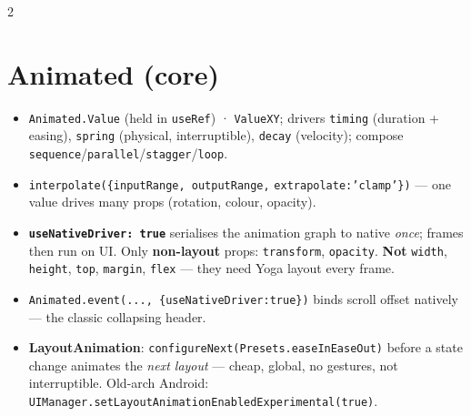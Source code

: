 \documentclass[8pt]{extarticle}
\begin{document}
\begin{multicols}{2}
\raggedright

\section{Animated (core)}
\begin{itemize}
  \item \texttt{Animated.Value} (held in \texttt{useRef}) · \texttt{ValueXY}; drivers
        \texttt{timing} (duration + easing), \texttt{spring} (physical, interruptible),
        \texttt{decay} (velocity); compose \texttt{sequence}/\texttt{parallel}/\texttt{stagger}/\texttt{loop}.
  \item \texttt{interpolate(\{inputRange, outputRange,} \texttt{extrapolate:'clamp'\})} —
        one value drives many props (rotation, colour, opacity).
  \item \textbf{\texttt{useNativeDriver: true}} serialises the animation graph to native
        \emph{once}; frames then run on UI. Only \textbf{non-layout} props:
        \texttt{transform}, \texttt{opacity}. \textbf{Not} \texttt{width}, \texttt{height},
        \texttt{top}, \texttt{margin}, \texttt{flex} — they need Yoga layout every frame.
  \item \texttt{Animated.event(..., \{useNativeDriver:true\})} binds scroll offset
        natively — the classic collapsing header.
  \item \textbf{LayoutAnimation}: \texttt{configureNext(Presets.easeInEaseOut)} before
        a state change animates the \emph{next layout} — cheap, global, no gestures, not
        interruptible. Old-arch Android: \texttt{UIManager.setLayoutAnimation}\allowbreak\texttt{EnabledExperimental(true)}.
\end{itemize}


\end{multicols}
\end{document}
